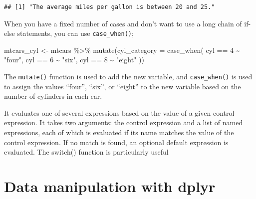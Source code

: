 \documentclass[
  12pt,
  oneside]{book}
\newenvironment{Shaded}{\begin{snugshade}}{\end{snugshade}}
\newcommand{\AttributeTok}[1]{\textcolor[rgb]{0.77,0.63,0.00}{#1}}
\newcommand{\CommentTok}[1]{\textcolor[rgb]{0.56,0.35,0.01}{\textit{#1}}}
\newcommand{\DecValTok}[1]{\textcolor[rgb]{0.00,0.00,0.81}{#1}}
\newcommand{\FunctionTok}[1]{\textcolor[rgb]{0.00,0.00,0.00}{#1}}
\newcommand{\NormalTok}[1]{#1}
\newcommand{\OtherTok}[1]{\textcolor[rgb]{0.56,0.35,0.01}{#1}}
\newcommand{\SpecialCharTok}[1]{\textcolor[rgb]{0.00,0.00,0.00}{#1}}
\newcommand{\StringTok}[1]{\textcolor[rgb]{0.31,0.60,0.02}{#1}}
\theoremstyle{definition}
\theoremstyle{definition}
\theoremstyle{definition}
\theoremstyle{definition}
\theoremstyle{remark}
\begin{document}
\begin{verbatim}
## [1] "The average miles per gallon is between 20 and 25."
\end{verbatim}

\begin{Shaded}
\end{Shaded}

When you have a fixed number of cases and don't want to use a long chain of if-else statements, you can use \texttt{case\_when()};

\begin{Shaded}
\begin{Highlighting}[]
\NormalTok{mtcars\_cyl }\OtherTok{\textless{}{-}}\NormalTok{ mtcars }\SpecialCharTok{\%\textgreater{}\%}
  \FunctionTok{mutate}\NormalTok{(}\AttributeTok{cyl\_category =} \FunctionTok{case\_when}\NormalTok{(}
\NormalTok{    cyl }\SpecialCharTok{==} \DecValTok{4} \SpecialCharTok{\textasciitilde{}} \StringTok{"four"}\NormalTok{,}
\NormalTok{    cyl }\SpecialCharTok{==} \DecValTok{6} \SpecialCharTok{\textasciitilde{}} \StringTok{"six"}\NormalTok{,}
\NormalTok{    cyl }\SpecialCharTok{==} \DecValTok{8} \SpecialCharTok{\textasciitilde{}} \StringTok{"eight"}
\NormalTok{  ))}
\end{Highlighting}
\end{Shaded}

The \texttt{mutate()} function is used to add the new variable, and \texttt{case\_when()} is used to assign the values ``four'', ``six'', or ``eight'' to the new variable based on the number of cylinders in each car.

It evaluates one of several expressions based on the value of a given control expression. It takes two arguments: the control expression and a list of named expressions, each of which is evaluated if its name matches the value of the control expression. If no match is found, an optional default expression is evaluated. The switch() function is particularly useful

\hypertarget{data-manipulation-with-dplyr}{%
\section{Data manipulation with dplyr}\label{data-manipulation-with-dplyr}}
\end{document}
